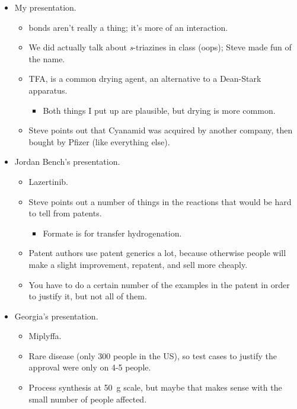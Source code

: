 \documentclass[../notes.tex]{subfiles}
\begin{document}
\begin{itemize}
\begin{itemize}
    \end{itemize}
    \item My presentation.
    \begin{itemize}
        \item {} bonds aren't really a thing; it's more of an interaction.
        \item We did actually talk about \emph{s}-triazines in class (oops); Steve made fun of the name.
        \item TFA,  is a common drying agent, an alternative to a Dean-Stark apparatus.
        \begin{itemize}
            \item Both things I put up are plausible, but drying is more common.
        \end{itemize}
        \item Steve points out that Cyanamid was acquired by another company, then bought by Pfizer (like everything else).
    \end{itemize}
    \item Jordan Bench's presentation.
    \begin{itemize}
        \item Lazertinib.
        \item Steve points out a number of things in the reactions that would be hard to tell from patents.
        \begin{itemize}
            \item Formate is for transfer hydrogenation.
        \end{itemize}
        \item Patent authors use patent generics a lot, because otherwise people will make a slight improvement, repatent, and sell more cheaply.
        \item You have to do a certain number of the examples in the patent in order to justify it, but not all of them.
    \end{itemize}
    \item Georgia's presentation.
    \begin{itemize}
        \item Miplyffa.
        \item Rare disease (only 300 people in the US), so test cases to justify the approval were only on 4-5 people.
        \item Process synthesis at \SI{50}{\gram} scale, but maybe that makes sense with the small number of people affected.
    \end{itemize}

\end{itemize}
\end{document}
